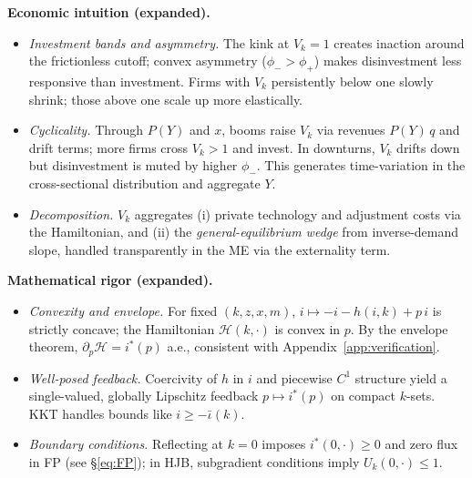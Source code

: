 ﻿\documentclass[11pt,letterpaper,oneside]{article}
\numberwithin{equation}{section}
\newcommand{\1}{\mathbf{1}}
\newcommand{\kbar}{\bar\iota}
\begin{document}
\begin{tcolorbox}[didacticstyle]
\textbf{Economic intuition (expanded).}
\begin{itemize}[leftmargin=1.15em,itemsep=0.25em]
  \item \emph{Investment bands and asymmetry.} The kink at $V_k=1$ creates inaction around the frictionless cutoff; convex asymmetry ($\phi_->\phi_+$) makes disinvestment less responsive than investment. Firms with $V_k$ persistently below one slowly shrink; those above one scale up more elastically.
  \item \emph{Cyclicality.} Through $P(Y)$ and $x$, booms raise $V_k$ via revenues $P(Y)\,q$ and drift terms; more firms cross $V_k>1$ and invest. In downturns, $V_k$ drifts down but disinvestment is muted by higher $\phi_-$. This generates time-variation in the cross-sectional distribution and aggregate $Y$.
  \item \emph{Decomposition.} $V_k$ aggregates (i) private technology and adjustment costs via the Hamiltonian, and (ii) the \emph{general-equilibrium wedge} from inverse-demand slope, handled transparently in the ME via the externality term.
\end{itemize}
\end{tcolorbox}

\begin{tcolorbox}[mathstyle]
\textbf{Mathematical rigor (expanded).}
\begin{itemize}[leftmargin=1.15em,itemsep=0.25em]
  \item \emph{Convexity and envelope.} For fixed $(k,z,x,m)$, $i\mapsto -i-h(i,k)+p\,i$ is strictly concave; the Hamiltonian $\mathcal H(k,\cdot)$ is convex in $p$. By the envelope theorem, $\partial_p\mathcal H=i^*(p)$ a.e., consistent with Appendix~\ref{app:verification}.
  \item \emph{Well-posed feedback.} Coercivity of $h$ in $i$ and piecewise $C^1$ structure yield a single-valued, globally Lipschitz feedback $p\mapsto i^*(p)$ on compact $k$-sets. KKT handles bounds like $i\ge-\kbar(k)$.
  \item \emph{Boundary conditions.} Reflecting at $k=0$ imposes $i^*(0,\cdot)\ge0$ and zero flux in FP (see \S\ref{eq:FP}); in HJB, subgradient conditions imply $U_k(0,\cdot)\le1$.
\end{itemize}
\end{tcolorbox}

\end{document}
